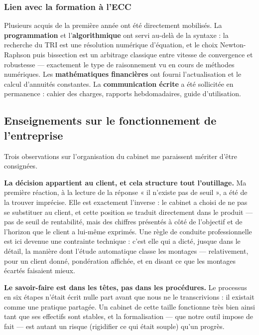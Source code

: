 \documentclass[12pt,a4paper]{article}
\begin{document}
\subsubsection{Lien avec la formation à l'ECC}

Plusieurs acquis de la première année ont été directement mobilisés.
La \textbf{programmation} et l'\textbf{algorithmique} ont servi au-delà de la
syntaxe : la recherche du TRI est une résolution numérique d'équation, et le
choix Newton-Raphson puis bissection est un arbitrage classique entre vitesse de
convergence et robustesse --- exactement le type de raisonnement vu en cours de
méthodes numériques. Les \textbf{mathématiques financières} ont fourni
l'actualisation et le calcul d'annuités constantes. La \textbf{communication
	écrite} a été sollicitée en permanence : cahier des charges, rapports
hebdomadaires, guide d'utilisation.


\subsection{Enseignements sur le fonctionnement de l'entreprise}

Trois observations sur l'organisation du cabinet me paraissent mériter d'être
consignées.

\textbf{La décision appartient au client, et cela structure tout l'outillage.}
Ma première réaction, à la lecture de la réponse « il n'existe pas de seuil »,
a été de la trouver imprécise. Elle est exactement l'inverse : le cabinet a
choisi de ne pas se substituer au client, et cette position se traduit
directement dans le produit --- pas de seuil de rentabilité, mais des chiffres
présentés à côté de l'objectif et de l'horizon que le client a lui-même
exprimés. Une règle de conduite professionnelle est ici devenue une contrainte
technique : c'est elle qui a dicté, jusque dans le détail, la manière dont
l'étude automatique classe les montages --- relativement, pour un client donné,
pondération affichée, et en disant ce que les montages écartés faisaient mieux.

\textbf{Le savoir-faire est dans les têtes, pas dans les procédures.} Le
processus en six étapes n'était écrit nulle part avant que nous ne le
transcrivions : il existait comme une pratique partagée. Un cabinet de cette
taille fonctionne très bien ainsi tant que ses effectifs sont stables, et la
formalisation --- que notre outil impose de fait --- est autant un risque
(rigidifier ce qui était souple) qu'un progrès.
\end{document}
